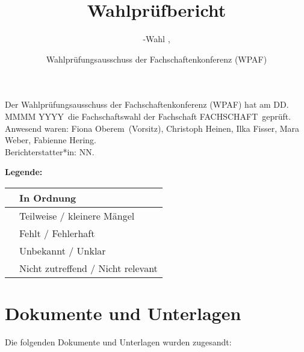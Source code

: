 \documentclass[a4paper]{scrartcl}
\title{Wahlprüfbericht}
\subtitle{\gremium-Wahl \fachschaft, \wahltermin}
\author{Wahlprüfungsausschuss der Fachschaftenkonferenz (WPAF)}
\date{\sitzungstermin}
\newcommand{\fullcheck}{\raisebox{-.8\dp\strutbox}{\texttt{[image: Check.pdf]}}}
\newcommand{\semicheck}{\raisebox{-.8\dp\strutbox}{\texttt{[image: Semicheck.pdf]}}}
\newcommand{\nocheck}{\raisebox{-.8\dp\strutbox}{\texttt{[image: Nocheck.pdf]}}}
\newcommand{\dontknow}{\raisebox{-.8\dp\strutbox}{\texttt{[image: Dontknow.pdf]}}}
\newcommand{\notrev}{\raisebox{-.8\dp\strutbox}{\texttt{[image: Notrev.pdf]}}}
\newcommand{\fachschaft}{FACHSCHAFT}
\newcommand{\sitzungstermin}{DD. MMMM YYYY}
\newcommand{\vorsitz}{Fiona Oberem}
\newcommand{\anwesende}{\vorsitz\ (Vorsitz), Christoph Heinen, Ilka Fisser, Mara Weber, Fabienne Hering}
\newcommand{\berichterstatter}{NN.} %
\begin{document}
\maketitle

Der Wahlprüfungsausschuss der Fachschaftenkonferenz (WPAF) hat am \sitzungstermin \ die Fachschaftswahl der Fachschaft \fachschaft\ geprüft. \\
Anwesend waren: \anwesende.\\ 
Berichterstatter*in: \berichterstatter

\textbf{Legende:}

\begin{tabular}{|c|l|}\hline
\fullcheck & In Ordnung \\\hline
\semicheck & Teilweise / kleinere Mängel \\\hline
\nocheck & Fehlt / Fehlerhaft\\\hline
\dontknow & Unbekannt / Unklar\\\hline
\notrev & Nicht zutreffend / Nicht relevant\\\hline
\end{tabular}


\section{Dokumente und Unterlagen}

Die folgenden Dokumente und Unterlagen wurden zugesandt:
\end{document}

